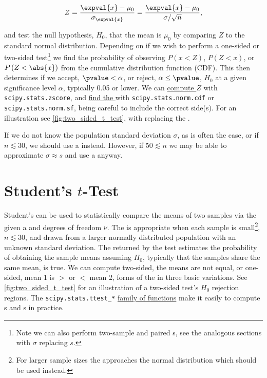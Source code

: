 \begin{equation}\label{eq:hypo:Z}
Z = \frac{\expval{x} - \mu_{0}}{\sigma_{\expval{x}}} = \frac{\expval{x} - \mu_{0}}{\sigma/\sqrt{n}},
\end{equation}

\noindent and test the null hypothesis, $H_{0}$, that the mean is $\mu_{0}$
by comparing $Z$ to the standard normal distribution.
Depending on if we wish to perform a one-sided or two-sided
test\footnote{Note we can also perform two-sample and paired {\Ztest}s, see the analogous \ttest sections with $\sigma$ replacing $s$.} we
find the probability of observing $P\left(x < Z\right)$, $P\left(Z < x\right)$, or $P\left(Z < \abs{x}\right)$
from the cumulative distribution function (CDF).
This \pvalue then determines if we accept, $\pvalue < \alpha$, or reject, $\alpha \leq \pvalue$,
$H_{0}$ at a given significance level $\alpha$, typically \num{0.05} or lower.
We can
\href{https://docs.scipy.org/doc/scipy/reference/generated/scipy.stats.zscore.html}{compute $Z$} with
\texttt{scipy.stats.zscore},
and \href{https://docs.scipy.org/doc/scipy/reference/generated/scipy.stats.norm.html}{find the \pvalue} with
\texttt{scipy.stats.norm.cdf} or \texttt{scipy.stats.norm.sf},
being careful to include the correct side(s).
For an illustration see \cref{fig:two_sided_t_test}, with \Zscore replacing the \tstat.

If we do not know the population standard deviation $\sigma$, as is often the case,
or if $n \lesssim 30$, we should use a \ttest instead.
However, if $50 \lesssim n$ we may be able to approximate $\sigma \approx s$
and use a \Ztest anyway.

\section{Student's \texorpdfstring{$t$}{t}-Test}
\label{hypo:t_test}

Student's \ttest can be used to
statistically compare the means of two samples via the \tdist
given a \tstat and degrees of freedom $\nu$.
The \ttest is appropriate when each sample is small\footnote{For
larger sample sizes the \tdist approaches the normal distribution which should be used instead.}, $n \lesssim 30$,
and drawn from a larger normally distributed population with an unknown standard deviation.
The \pvalue returned by the test estimates the probability of obtaining the sample means
assuming $H_{0}$, typically that the samples share the same mean, is true.
We can compute two-sided, \ie the means are not equal, or one-sided, \ie mean 1 is $>$ or $<$ mean 2,
forms of the \ttest in three basic variations.
See \cref{fig:two_sided_t_test} for an illustration of a two-sided test's $H_{0}$ rejection regions.
The \texttt{scipy.stats.ttest\_*}
\href{https://docs.scipy.org/doc/scipy/reference/stats.html#statistical-tests}{family of functions}
make it easily to compute {\tstat}s and {\pvalue}s in practice.

